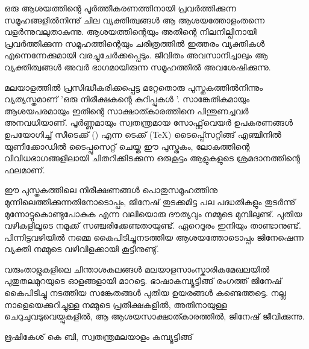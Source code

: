 
ഒരു ആശയത്തിന്റെ പൂര്‍ത്തീകരണത്തിനായി പ്രവര്‍ത്തിക്കുന്ന സമൂഹങ്ങളില്‍നിന്നു് ചില വ്യക്തിത്വങ്ങള്‍ ആ ആശയത്തോളംതന്നെ
വളര്‍ന്നുവലുതാകുന്നു. ആശയത്തിന്റെയും  അതിന്റെ നിലനില്പിനായി പ്രവര്‍ത്തിക്കുന്ന സമൂഹത്തിന്റെയും  ചരിത്രത്തില്‍ ഇത്തരം  വ്യക്തികള്‍ എന്നെന്നേക്കുമായി വരച്ചുചേര്‍ക്കപ്പെടും. ജീവിതം അവസാനിച്ചാലും ആ വ്യക്തിത്വങ്ങള്‍ അവര്‍ ഭാഗമായിരുന്ന സമൂഹത്തില്‍ അവശേഷിക്കുന്നു. 

മലയാളത്തില്‍ പ്രസിദ്ധീകരിക്കപ്പെട്ട മറ്റേതൊരു പുസ്തകത്തില്‍നിന്നും വ്യത്യസ്തമാണ് 'ഒരു നിരീക്ഷകന്റെ കുറിപ്പുകള്‍ '. 
സാങ്കേതികമായും ആശയപരമായും ഇതിന്റെ സാക്ഷാത്കാരത്തിനെ പിന്തുണച്ചവര്‍ അനവധിയാണ്. പൂര്‍ണ്ണമായും സ്വതന്ത്രമായ 
സോഫ്റ്റ്‌‌വെയര്‍ ഉപകരണങ്ങള്‍ ഉപയോഗിച്ച് സീടെക്ക് (\XeTeX) എന്ന ടെക്ക് (\TeX) ടൈപ്പ്സെറ്റിങ്ങ് എഞ്ചിനില്‍ യുണീക്കോഡില്‍ ടൈപ്പുസെറ്റ് ചെയ്ത
ഈ പുസ്തകം, ലോകത്തിന്റെ വിവിധഭാഗങ്ങളിലായി ചിതറിക്കിടക്കുന്ന ഒരുകൂട്ടം ആളുകളുടെ ശ്രമദാനത്തിന്റെ ഫലമാണ്.   

ഈ പുസ്തകത്തിലെ നിരീക്ഷണങ്ങള്‍ പൊതുസമൂഹത്തിനു മുന്നിലെത്തിക്കുന്നതിനോടൊപ്പം, ജിനേഷ് തുടക്കമിട്ട പല പദ്ധതികളും  
തുടര്‍ന്നു് മുന്നോട്ടുകൊണ്ടുപോകുക എന്ന വലിയൊരു ദൗത്യവും നമ്മുടെ മുമ്പിലുണ്ട്. പുതിയ വഴികളിലൂടെ നമുക്ക് സഞ്ചരിക്കേണ്ടതായുണ്ട്. ഏറെദൂരം ഇനിയും താണ്ടാനുണ്ട്. പിന്നിട്ടവഴിയില്‍ നമ്മെ കൈപിടിച്ചുനടത്തിയ ആശയത്തോടൊപ്പം  ജിനേഷെന്ന വ്യക്തി നമ്മുടെ വഴിവിളക്കായി കൂട്ടിനുണ്ടു്.

വരുംതാളുകളിലെ ചിന്താശകലങ്ങള്‍ മലയാളസാംസ്കാരികമേഖലയില്‍ പുതുതലമുറയുടെ ഓളങ്ങളായി മാറട്ടെ. 
ഭാഷാകമ്പ്യൂട്ടിങ്ങ് രംഗത്ത് ജിനേഷ് കൈപിടിച്ചു നടത്തിയ സങ്കേതങ്ങള്‍ പുതിയ ഉയരങ്ങള്‍ കണ്ടെത്തട്ടെ.  നല്ല നാളെയെക്കുറിച്ചുള്ള നമ്മുടെ പ്രതീക്ഷകളില്‍,
അതിനായുള്ള ചെറുചുവടുവെയ്പുകളില്‍, ആ ആശയസാക്ഷാത്കാരത്തില്‍, ജിനേഷ് ജീവിക്കുന്നു. 

\begin{flushright}ഋഷികേശ് കെ ബി,  സ്വതന്ത്രമലയാളം കമ്പ്യൂട്ടിങ്ങ് \end{flushright}
\newpage



